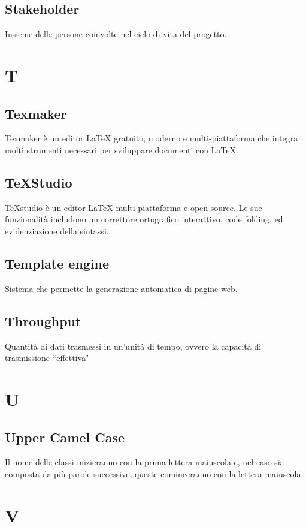 {	\subsection{Stakeholder}
	Insieme delle persone coinvolte nel ciclo di vita del progetto.
	
	\section{T}
	\subsection{Texmaker} 
	Texmaker è un editor LaTeX gratuito, moderno e multi-piattaforma che integra molti strumenti necessari per sviluppare documenti con LaTeX. 
	
	\subsection{TeXStudio} 
	TeXstudio è un editor LaTeX multi-piattaforma e open-source. Le sue funzionalità includono un correttore ortografico interattivo, code folding, ed evidenziazione della sintassi.
	
	\subsection{Template engine}
	Sistema che permette la generazione automatica di pagine web.
	
	\subsection{Throughput}
	Quantità di dati trasmessi in un'unità di tempo, ovvero la capacità di trasmissione ``effettiva"
	
	\section{U}
	\subsection{Upper Camel Case} 
	Il nome delle classi inizieranno con la prima lettera maiuscola e, nel caso sia composta da più parole successive, queste cominceranno con la lettera maiuscola
	
	\section{V}
}
